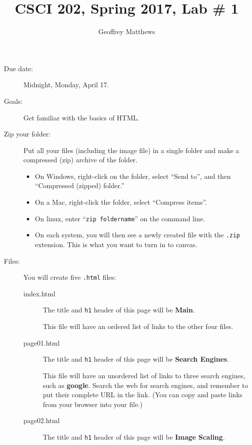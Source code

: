 \documentclass{article}
\title{CSCI 202, Spring 2017, Lab \# 1}
\author{Geoffrey Matthews}
\begin{document}
\maketitle

\begin{description}

\item[Due date:] Midnight, Monday, April 17.

\item[Goals:] Get familiar with the basics of HTML.

\item[Zip your folder:]

  Put all your files (including the image file) in a single folder and
  make a compressed (zip) archive of the folder.
  \begin{itemize}
  \item
  On Windows,
  right-click on the folder, select ``Send to'', and then
  ``Compressed (zipped) folder.''
  \item
  On a Mac, right-click the folder, select ``Compress items''.
\item
  On linux, enter ``{\tt zip foldername}'' on the command line.
  \item
  On each system, you will then see a newly created file with
  the {\tt .zip} extension.  This is what you want to turn in to
  canvas.
  \end{itemize}
  
\item[Files:]  You will create five {\tt .html} files:
  \begin{description}
  \item[index.html]
    The title and {\tt h1} header of this page will be {\bf Main}.
    
    This file will have an ordered list of links to
    the other four files.

  \item[page01.html]The title and {\tt h1} header of this page will be
    {\bf Search Engines}.

    This file will have an unordered list of links to
    three search engines, such as {\bf google}.  Search the web for
    search engines, and remember to put their complete URL in the
    link.  (You can copy and paste links from your browser into your
    file.) 

  \item[page02.html] The title and {\tt h1} header of this page will
    be {\bf Image Scaling}.


\end{description}
\end{description}
\end{document}

